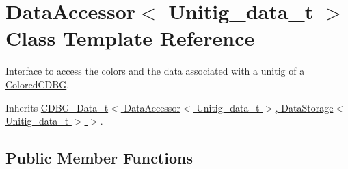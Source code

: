 \hypertarget{classDataAccessor}{}\section{Data\+Accessor$<$ Unitig\+\_\+data\+\_\+t $>$ Class Template Reference}
\label{classDataAccessor}


Interface to access the colors and the data associated with a unitig of a \hyperlink{classColoredCDBG}{Colored\+C\+D\+BG}.  




Inherits \hyperlink{classCDBG__Data__t}{C\+D\+B\+G\+\_\+\+Data\+\_\+t$<$ Data\+Accessor$<$ Unitig\+\_\+data\+\_\+t $>$, Data\+Storage$<$ Unitig\+\_\+data\+\_\+t $>$ $>$}.

\subsection*{Public Member Functions}
